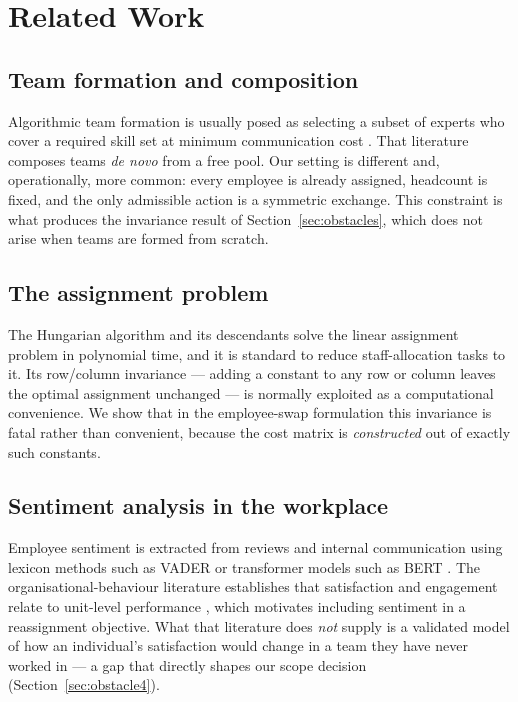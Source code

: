 \documentclass[conference]{IEEEtran}
\begin{document}
\section{Related Work}\label{sec:related}

\subsection{Team formation and composition}
Algorithmic team formation is usually posed as selecting a subset of experts who
cover a required skill set at minimum communication cost
\cite{lappas2009,anagnostopoulos2012}. That literature composes teams
\emph{de novo} from a free pool. Our setting is different and, operationally,
more common: every employee is already assigned, headcount is fixed, and the only
admissible action is a symmetric exchange. This constraint is what produces the
invariance result of Section~\ref{sec:obstacles}, which does not arise when teams
are formed from scratch.

\subsection{The assignment problem}
The Hungarian algorithm \cite{kuhn1955,munkres1957} and its descendants
\cite{burkard2009,lawler1976} solve the linear assignment problem in polynomial
time, and it is standard to reduce staff-allocation tasks to it. Its
row/column invariance --- adding a constant to any row or column leaves the
optimal assignment unchanged --- is normally exploited as a computational
convenience. We show that in the employee-swap formulation this invariance is
fatal rather than convenient, because the cost matrix is \emph{constructed} out
of exactly such constants.

\subsection{Sentiment analysis in the workplace}
Employee sentiment is extracted from reviews and internal communication using
lexicon methods such as VADER \cite{hutto2014} or transformer models such as BERT
\cite{devlin2019}. The organisational-behaviour literature establishes that
satisfaction and engagement relate to unit-level performance
\cite{harter2002,judge2001}, which motivates including sentiment in a
reassignment objective. What that literature does \emph{not} supply is a
validated model of how an individual's satisfaction would change in a team they
have never worked in --- a gap that directly shapes our scope decision
(Section~\ref{sec:obstacle4}).
\end{document}
